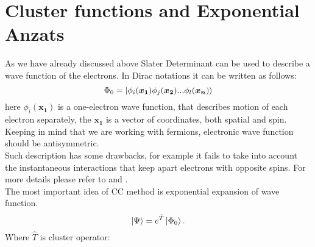 \documentclass[twoside,english]{uiofysmaster}
\theoremstyle{definition}
\begin{document}
\section{Cluster functions and Exponential Anzats} 
As we have already discussed above Slater Determinant can be used to describe a wave function of the electrons. In Dirac notations it can be written as follows:
\begin{equation}
\Phi_0 =  \ket{\phi_i(\bm{x_1})\phi_j(\bm{x_2}) ...\phi_l(\bm{x_n})}
\end{equation}
here $\phi_i(\bm{x_1})$ is a one-electron wave function, that describes motion of each electron separately, the $\bm{x_1}$ is a vector of coordinates, both spatial and spin. \\
Keeping in mind that we are working with fermions, electronic wave function should be antisymmetric. \\
Such description has some drawbacks, for example it fails to take into account the instantaneous interactions that keep apart electrons with opposite spins. For more details please refer to  \cite{bartlettApplicationsPostHartree2007} and \cite{ModernQuantumChemistry}. \\
The most important idea of CC method is exponential expansion of wave function. 
\begin{equation}\label{eq:exponential ansatz}
\ket{\Psi}=e^{\hat{T}}\ket{\Phi_0}.
\end{equation}
Where $\hat{T}$ is cluster operator:
\end{document}
